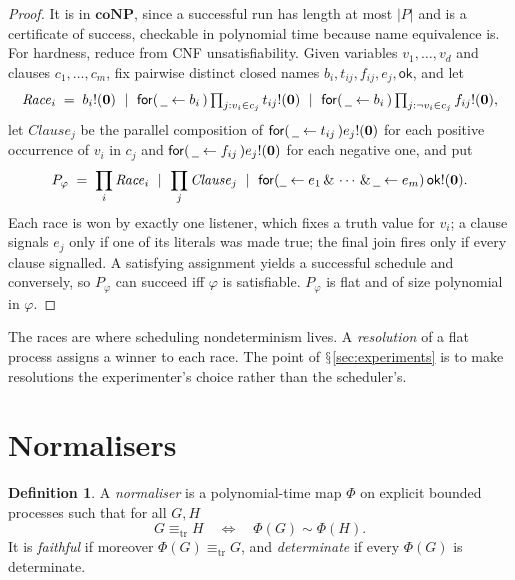 \documentclass[11pt]{article}
\theoremstyle{definition}
\newtheorem{definition}{Definition}[section]
\theoremstyle{plain}
\theoremstyle{remark}
\newcommand{\inp}[3]{\mathsf{for}(\,#1 \leftarrow #2\,)#3}
\newcommand{\out}[2]{#1!(#2)}
\newcommand{\nil}{\mathbf{0}}
\newcommand{\sbisim}{\sim}
\newcommand{\treq}{\equiv_{\mathrm{tr}}}
\newcommand{\wild}{\mathord{\underline{\hspace{0.5em}}}}
\DeclareRobustCommand{\S}{\ifmmode\mathsection\else$\mathsection$\fi}
\newcommand{\ok}{\mathsf{ok}}
\newcommand{\coNP}{\mathbf{coNP}}
\begin{document}
\begin{proof}
It is in $\coNP$, since a successful run has length at most $|P|$ and is a
certificate of success, checkable in polynomial time because name
equivalence is. For hardness, reduce from CNF unsatisfiability.
Given variables $v_1, \dots, v_d$ and clauses $c_1, \dots, c_m$, fix
pairwise distinct closed names $b_i, t_{ij}, f_{ij}, e_j, \ok$, and let
\[
\mathit{Race}_i \;=\; \out{b_i}{\nil}
  \ \mid\ \inp{\wild}{b_i}{\textstyle\prod_{j : v_i \in c_j} \out{t_{ij}}{\nil}}
  \ \mid\ \inp{\wild}{b_i}{\textstyle\prod_{j : \neg v_i \in c_j} \out{f_{ij}}{\nil}},
\]
let $\mathit{Clause}_j$ be the parallel composition of
$\inp{\wild}{t_{ij}}{\out{e_j}{\nil}}$ for each positive occurrence of
$v_i$ in $c_j$ and $\inp{\wild}{f_{ij}}{\out{e_j}{\nil}}$ for each
negative one, and put
\[
P_\varphi \;=\; \prod_i \mathit{Race}_i \ \mid\ \prod_j \mathit{Clause}_j
  \ \mid\ \mathsf{for}(\wild \leftarrow e_1 \,\&\, \cdots \,\&\,
  \wild \leftarrow e_m)\, \out{\ok}{\nil}.
\]
Each race is won by exactly one listener, which fixes a truth value for
$v_i$; a clause signals $e_j$ only if one of its literals was made true;
the final join fires only if every clause signalled. A satisfying
assignment yields a successful schedule and conversely, so $P_\varphi$
can succeed iff $\varphi$ is satisfiable. $P_\varphi$ is flat and of size
polynomial in $\varphi$.
\end{proof}

The races are where scheduling nondeterminism lives. A \emph{resolution}
of a flat process assigns a winner to each race. The point of
\S\ref{sec:experiments} is to make resolutions the experimenter's choice
rather than the scheduler's.

\section{Normalisers}\label{sec:normaliser}

\begin{definition}\label{def:normaliser}
A \emph{normaliser} is a polynomial-time map $\Phi$ on explicit bounded
processes such that for all $G, H$
\[
G \treq H \quad\Longleftrightarrow\quad \Phi(G) \sbisim \Phi(H).
\]
It is \emph{faithful} if moreover $\Phi(G) \treq G$, and \emph{determinate}
if every $\Phi(G)$ is determinate.
\end{definition}
\end{document}
